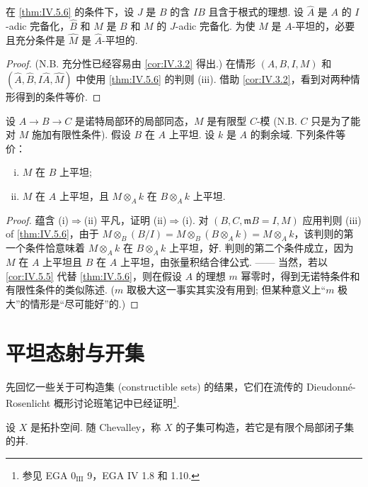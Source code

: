 \begin{corollary}\label{cor:IV.5.8}
在 \ref{thm:IV.5.6} 的条件下，设 $J$ 是 $B$ 的含 $IB$ 且含于根式的理想. 设 $\widehat{A}$ 是 $A$ 的 $I$-adic 完备化，$\widehat{B}$ 和 $M$ 是 $B$ 和 $M$ 的 $J$-adic 完备化. 为使 $M$ 是 $A$-平坦的，必要且充分条件是 $\widehat{M}$ 是 $\widehat{A}$-平坦的.
\end{corollary}

\begin{proof}
(N.B. 充分性已经容易由 \ref{cor:IV.3.2} 得出.) 在情形 $(A, B, I, M)$ 和 $(\widehat{A}, \widehat{B}, I\widehat{A}, \widehat{M})$ 中使用 \ref{thm:IV.5.6} 的判则 (iii). 借助 \ref{cor:IV.3.2}，看到对两种情形得到的条件等价.
\end{proof}

\begin{corollary}\label{cor:IV.5.9}
设 $A \to B \to C$ 是诺特局部环的局部同态，$M$ 是有限型 $C$-模 (N.B. $C$ 只是为了能对 $M$ 施加有限性条件). 假设 $B$ 在 $A$ 上平坦. 设 $k$ 是 $A$ 的剩余域. 下列条件等价：
\begin{enumerate}[(i)]
\item $M$ 在 $B$ 上平坦; 
\item $M$ 在 $A$ 上平坦，且 $M \otimes_A k$ 在 $B \otimes_A k$ 上平坦.
\end{enumerate}
\end{corollary}

\begin{proof}
蕴含 (i)$\Rightarrow$(ii) 平凡，证明 (ii)$\Rightarrow$(i). 对 $(B, C, \mathfrak{m}B = I, M)$ 应用判则 (iii) of \ref{thm:IV.5.6}，由于 $M \otimes_B (B/I) = M \otimes_B (B \otimes_A k) = M \otimes_A k$，该判则的第一个条件恰意味着 $M \otimes_A k$ 在 $B \otimes_A k$ 上平坦，好. 判则的第二个条件成立，因为 $M$ 在 $A$ 上平坦且 $B$ 在 $A$ 上平坦，由张量积结合律公式. —— 当然，若以 \ref{cor:IV.5.5} 代替 \ref{thm:IV.5.6}，则在假设 $A$ 的理想 $m$ 幂零时，得到无诺特条件和有限性条件的类似陈述. ($m$ 取极大这一事实其实没有用到; 但某种意义上``$m$ 极大''的情形是``尽可能好''的.)
\end{proof}

\section{平坦态射与开集}

先回忆一些关于可构造集 (constructible sets) 的结果，它们在流传的 Dieudonné-Rosenlicht 概形讨论班笔记中已经证明\footnote{参见 EGA 0$_{\mathrm{III}}$ 9，EGA IV 1.8 和 1.10.}.

设 $X$ 是拓扑空间. 随 Chevalley，称 $X$ 的子集可构造，若它是有限个局部闭子集的并.

